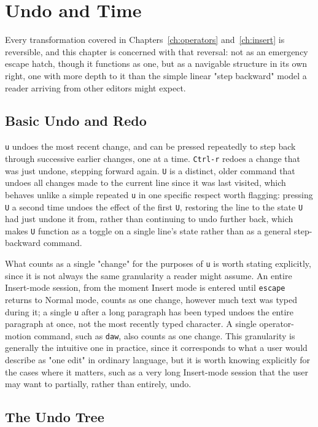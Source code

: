 \chapter{Undo and Time}
\label{ch:undo}

Every transformation covered in Chapters~\ref{ch:operators} and~\ref{ch:insert} is reversible, and this chapter is concerned with that reversal: not as an emergency escape hatch, though it functions as one, but as a navigable structure in its own right, one with more depth to it than the simple linear "step backward" model a reader arriving from other editors might expect.

\section{Basic Undo and Redo}

\texttt{u} undoes the most recent change, and can be pressed repeatedly to step back through successive earlier changes, one at a time. \texttt{Ctrl-r} redoes a change that was just undone, stepping forward again. \texttt{U} is a distinct, older command that undoes all changes made to the current line since it was last visited, which behaves unlike a simple repeated \texttt{u} in one specific respect worth flagging: pressing \texttt{U} a second time undoes the effect of the first \texttt{U}, restoring the line to the state \texttt{U} had just undone it from, rather than continuing to undo further back, which makes \texttt{U} function as a toggle on a single line's state rather than as a general step-backward command.

What counts as a single "change" for the purposes of \texttt{u} is worth stating explicitly, since it is not always the same granularity a reader might assume. An entire Insert-mode session, from the moment Insert mode is entered until \texttt{escape} returns to Normal mode, counts as one change, however much text was typed during it; a single \texttt{u} after a long paragraph has been typed undoes the entire paragraph at once, not the most recently typed character. A single operator-motion command, such as \texttt{daw}, also counts as one change. This granularity is generally the intuitive one in practice, since it corresponds to what a user would describe as "one edit" in ordinary language, but it is worth knowing explicitly for the cases where it matters, such as a very long Insert-mode session that the user may want to partially, rather than entirely, undo.

\section{The Undo Tree}


